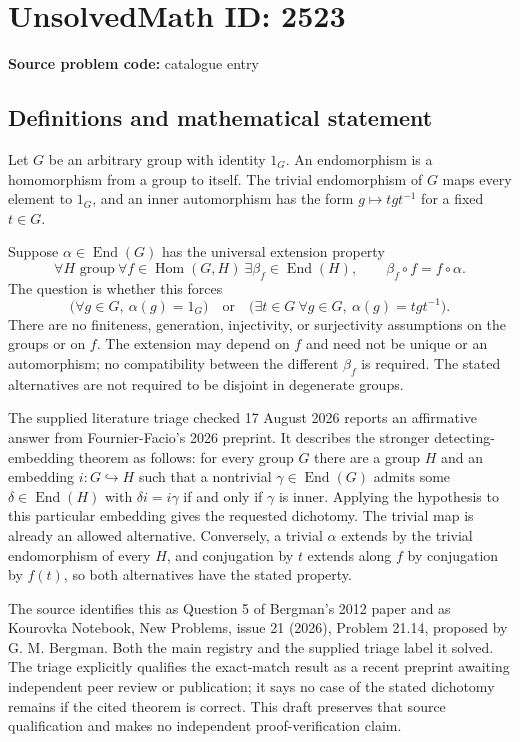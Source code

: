 \documentclass[11pt]{article}
\begin{document}
\section*{UnsolvedMath ID: 2523}
\textbf{Source problem code:} catalogue entry
\subsection{Definitions and mathematical statement}
Let $G$ be an arbitrary group with identity $1_G$. An endomorphism is a homomorphism from a group to itself. The trivial endomorphism of $G$ maps every element to $1_G$, and an inner automorphism has the form $g\mapsto tgt^{-1}$ for a fixed $t\in G$.

Suppose $\alpha\in\operatorname{End}(G)$ has the universal extension property
\[
 \forall H\text{ group}\ \forall f\in\operatorname{Hom}(G,H)\
 \exists\beta_f\in\operatorname{End}(H),\qquad
 \beta_f\circ f=f\circ\alpha.
\]
The question is whether this forces
\[
 \bigl(\forall g\in G,\ \alpha(g)=1_G\bigr)
 \quad\text{or}\quad
 \bigl(\exists t\in G\ \forall g\in G,\ \alpha(g)=tgt^{-1}\bigr).
\]
There are no finiteness, generation, injectivity, or surjectivity assumptions on the groups or on $f$. The extension may depend on $f$ and need not be unique or an automorphism; no compatibility between the different $\beta_f$ is required. The stated alternatives are not required to be disjoint in degenerate groups.

The supplied literature triage checked 17 August 2026 reports an affirmative answer from Fournier-Facio's 2026 preprint. It describes the stronger detecting-embedding theorem as follows: for every group $G$ there are a group $H$ and an embedding $i:G\hookrightarrow H$ such that a nontrivial $\gamma\in\operatorname{End}(G)$ admits some $\delta\in\operatorname{End}(H)$ with $\delta i=i\gamma$ if and only if $\gamma$ is inner. Applying the hypothesis to this particular embedding gives the requested dichotomy. The trivial map is already an allowed alternative. Conversely, a trivial $\alpha$ extends by the trivial endomorphism of every $H$, and conjugation by $t$ extends along $f$ by conjugation by $f(t)$, so both alternatives have the stated property.

The source identifies this as Question 5 of Bergman's 2012 paper and as Kourovka Notebook, New Problems, issue 21 (2026), Problem 21.14, proposed by G. M. Bergman. Both the main registry and the supplied triage label it solved. The triage explicitly qualifies the exact-match result as a recent preprint awaiting independent peer review or publication; it says no case of the stated dichotomy remains if the cited theorem is correct. This draft preserves that source qualification and makes no independent proof-verification claim.
\end{document}
